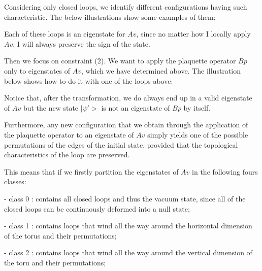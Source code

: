 \documentclass[12pt]{report}
\begin{document}
\begin{minipage}{1\textwidth}
		Considering only closed loops, we identify different configurations having such characteristic. The below illustrations show some examples of them:\newline
		
		
		Each of these loops is an eigenstate for $Av$, since no matter how I locally apply $Av$, I will always preserve the sign of the state. \newline
	
		
		
		
	\end{minipage}
	
	
	
	\begin{minipage}{1\textwidth}
		
		Then we focus on constraint (2). We want to apply the plaquette operator $Bp$ only to eigenstates of $Av$, which we have determined above. The illustration below shows how to do it with one of the loops above:\newline
		
	
		
		Notice that, after the transformation, we do always end up in a valid eigenstate of $Av$ but the new state $|\psi'>$ is not an eigenstate of $Bp$ by itself.\newline
		
		Furthermore, any new configuration that we obtain through the application of the plaquette operator to an eigenstate of $Av$ simply yields one of the possible permutations of the edges of the initial state, provided that the topological characteristics of the loop are preserved.\newline
		
		This means that if we firstly partition the eigenstates of $Av$ in the following fours classes: \newline
		
		- class 0 : contains all closed loops and thus the vacuum state,
		since all of the closed loops can be continuously deformed into a null state; \newline
		
		- class 1 : contains loops that wind all the way around the horizontal dimension of the torus and their permutations;\newline
		
		- class 2 : contains loops that wind all the way around the vertical dimension of the toru and their permutations;\newline
		

\end{minipage}
\end{document}

